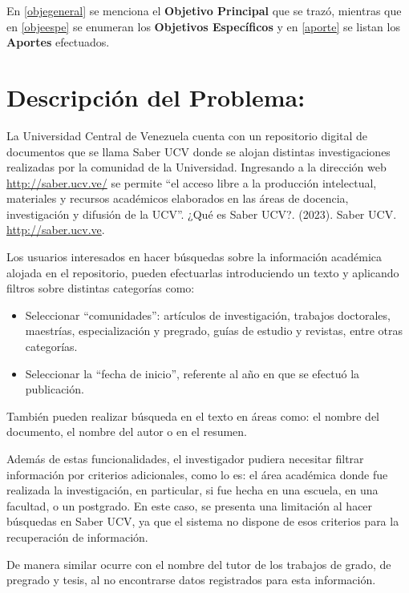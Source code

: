 \documentclass[
  12pt,
  openany]{book}
\begin{document}
En \ref{objegeneral} se menciona el \textbf{Objetivo Principal} que se trazó, mientras que en \ref{objeespe} se enumeran los \textbf{Objetivos Específicos} y en \ref{aporte} se listan los \textbf{Aportes} efectuados.

\hypertarget{desproblema}{%
\section{Descripción del Problema:}\label{desproblema}}

La Universidad Central de Venezuela cuenta con un repositorio digital de documentos que se llama Saber UCV donde se alojan distintas investigaciones realizadas por la comunidad de la Universidad. Ingresando a la dirección web \url{http://saber.ucv.ve/} se permite ``el acceso libre a la producción intelectual, materiales y recursos académicos elaborados en las áreas de docencia, investigación y difusión de la UCV''. ¿Qué es Saber UCV?. (2023). Saber UCV. \href{http://saber.ucv.ve/}{http://saber.ucv.ve}.

Los usuarios interesados en hacer búsquedas sobre la información académica alojada en el repositorio, pueden efectuarlas introduciendo un texto y aplicando filtros sobre distintas categorías como:

\begin{itemize}
\item
  Seleccionar ``comunidades'': artículos de investigación, trabajos doctorales, maestrías, especialización y pregrado, guías de estudio y revistas, entre otras categorías.
\item
  Seleccionar la ``fecha de inicio'', referente al año en que se efectuó la publicación.
\end{itemize}

También pueden realizar búsqueda en el texto en áreas como: el nombre del documento, el nombre del autor o en el resumen.

Además de estas funcionalidades, el investigador pudiera necesitar filtrar información por criterios adicionales, como lo es: el área académica donde fue realizada la investigación, en particular, si fue hecha en una escuela, en una facultad, o un postgrado. En este caso, se presenta una limitación al hacer búsquedas en Saber UCV, ya que el sistema no dispone de esos criterios para la recuperación de información.

De manera similar ocurre con el nombre del tutor de los trabajos de grado, de pregrado y tesis, al no encontrarse datos registrados para esta información.
\end{document}
